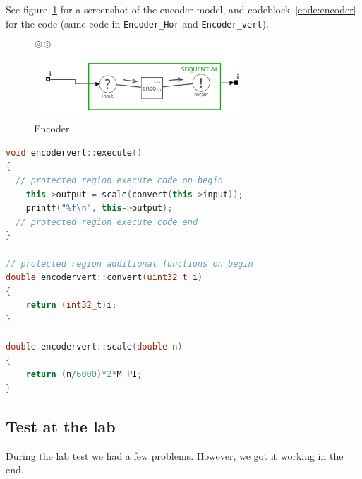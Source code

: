 \documentclass[a4paper,twoside,11pt]{article}
\begin{document}
See figure~\ref{fig:jiwy-encoder} for a screenshot of the encoder model, and 
codeblock~\ref{code:encoder} for the code (same code in \texttt{Encoder\_Hor} and \texttt{Encoder\_vert}).
\begin{figure}[ht]
	\centering
	\includegraphics[width=0.7\textwidth]{./img/jiwy-encoder.png}
	\caption{Encoder}
	\label{fig:jiwy-encoder}
\end{figure}
\begin{lstlisting}[caption=Relevant code of the Encoder\_vert and Encoder\_hor models, label=code:encoder, language=C++]
void encodervert::execute()
{
  // protected region execute code on begin
	this->output = scale(convert(this->input));
	printf("%f\n", this->output);
  // protected region execute code end
}

// protected region additional functions on begin
double encodervert::convert(uint32_t i)
{
	return (int32_t)i;
}

double encodervert::scale(double n)
{
	return (n/6000)*2*M_PI;
}
\end{lstlisting}
\subsection{Test at the lab}
During the lab test we had a few problems. However, we got it working in the end.
\end{document}
